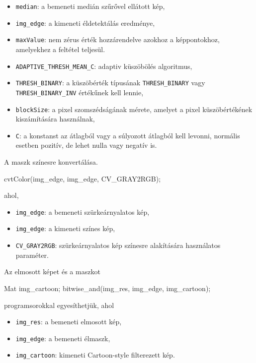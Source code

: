 \begin{itemize}
    \item \texttt{median}: a bemeneti medián szűrővel ellátott kép,
    \item \texttt{img\_edge}: a kimeneti éldetektálás eredménye,
    \item \texttt{maxValue}: nem zérus érték hozzárendelve azokhoz a képpontokhoz, amelyekhez a feltétel teljesül.
    \item \texttt{ADAPTIVE\_THRESH\_MEAN\_C}: adaptiv küszöbölés algoritmus,
    \item \texttt{THRESH\_BINARY}: a küszöbérték típusának \texttt{THRESH\_BINARY} vagy \texttt{THRESH\_BINARY\_INV} értékűnek kell lennie,
    \item \texttt{blockSize}: a pixel szomszédságának mérete, amelyet a pixel küszöbértékének kiszámítására használnak,
    \item \texttt{C}: a konstanst az átlagból vagy a súlyozott átlagból kell levonni, normális esetben pozitív, de lehet nulla vagy negatív is.
\end{itemize}
A maszk színesre konvertálása.
\begin{cpp}
cvtColor(img_edge, img_edge, CV_GRAY2RGB);
\end{cpp}
ahol,
\begin{itemize}
    \item \texttt{img\_edge}: a bemeneti szürkeárnyalatos kép,
    \item \texttt{img\_edge}: a kimeneti színes kép,
    \item \texttt{CV\_GRAY2RGB}: szürkeárnyalatos kép színesre alakítására használatos paraméter.
\end{itemize}
Az elmosott képet és a maszkot 
\begin{cpp}
Mat img_cartoon;
bitwise_and(img_res, img_edge, img_cartoon);
\end{cpp}
programsorokkal egyesíthetjük, ahol
\begin{itemize}
    \item \texttt{img\_res}: a bemeneti elmosott kép,
    \item \texttt{img\_edge}: a bemeneti élmaszk,
    \item \texttt{img\_cartoon}: kimeneti Cartoon-style filterezett kép.
\end{itemize}


